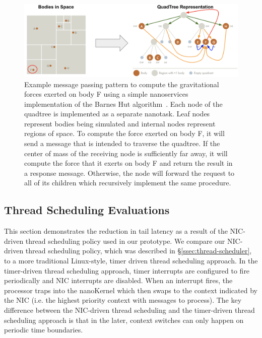 \begin{figure}
 \includegraphics[width=\linewidth]{./figures/barnes-hut}
 \caption{Example message passing pattern to compute the gravitational forces exerted on body F using a simple nanoservices implementation of the Barnes Hut algorithm~\cite{barnes-hut}. Each node of the quadtree is implemented as a separate nanotask. Leaf nodes represent bodies being simulated and internal nodes represent regions of space. To compute the force exerted on body F, it will send a message that is intended to traverse the quadtree. If the center of mass of the receiving node is sufficiently far away, it will compute the force that it exerts on body F and return the result in a response message. Otherwise, the node will forward the request to all of its children which recursively implement the same procedure.}
 \label{fig:barnes-hut}
\end{figure}

\subsection{Thread Scheduling Evaluations}
This section demonstrates the reduction in tail latency as a result of the NIC-driven thread scheduling policy used in our \name{} prototype.
We compare our NIC-driven thread scheduling policy, which was described in \S\ref{ssec:thread-scheduler}, to a more traditional Linux-style, timer driven thread scheduling approach.
In the timer-driven thread scheduling approach, timer interrupts are configured to fire periodically and NIC interrupts are disabled.
When an interrupt fires, the processor traps into the nanoKernel which then swaps to the context indicated by the NIC (i.e. the highest priority context with messages to process).
The key difference between the NIC-driven thread scheduling and the timer-driven thread scheduling approach is that in the later, context switches can only happen on periodic time boundaries.

